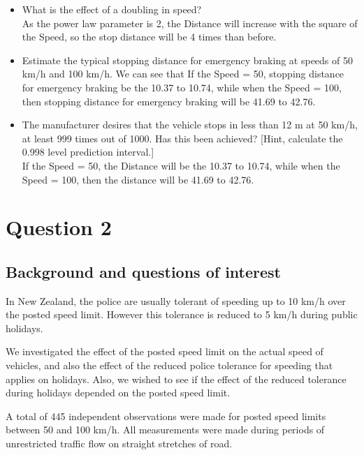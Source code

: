 \documentclass[
]{article}
\begin{document}
\begin{itemize}
\item
  What is the effect of a doubling in speed?\\
  As the power law parameter is 2, the Distance will increase with the
  square of the Speed, so the stop distance will be 4 times than before.
\item
  Estimate the typical stopping distance for emergency braking at speeds
  of 50 km/h and 100 km/h. We can see that If the Speed = 50, stopping
  distance for emergency braking be the 10.37 to 10.74, while when the
  Speed = 100, then stopping distance for emergency braking will be
  41.69 to 42.76.
\item
  The manufacturer desires that the vehicle stops in less than 12 m at
  50 km/h, at least 999 times out of 1000. Has this been achieved?
  {[}Hint, calculate the 0.998 level prediction interval.{]}\\
  If the Speed = 50, the Distance will be the 10.37 to 10.74, while when
  the Speed = 100, then the distance will be 41.69 to 42.76.
\end{itemize}

\newpage

\hypertarget{question-2}{%
\section{Question 2}\label{question-2}}

\hypertarget{background-and-questions-of-interest}{%
\subsection{Background and questions of
interest}\label{background-and-questions-of-interest}}

In New Zealand, the police are usually tolerant of speeding up to 10
km/h over the posted speed limit. However this tolerance is reduced to 5
km/h during public holidays.

We investigated the effect of the posted speed limit on the actual speed
of vehicles, and also the effect of the reduced police tolerance for
speeding that applies on holidays. Also, we wished to see if the effect
of the reduced tolerance during holidays depended on the posted speed
limit.

A total of 445 independent observations were made for posted speed
limits between 50 and 100 km/h. All measurements were made during
periods of unrestricted traffic flow on straight stretches of road.
\end{document}
